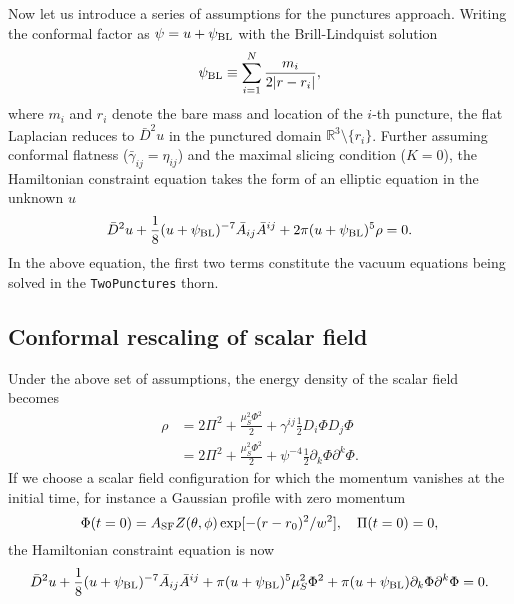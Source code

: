 Now let us introduce a series of assumptions for the punctures approach.
Writing the conformal factor as
$ \psi = u + \psi_{\rm BL} $
with the Brill-Lindquist solution
\begin{equation}
    \psi_{\rm BL} \equiv \sum_{i=1}^N \frac{m_i}{2|r - r_i|},
\end{equation}
where $m_i$ and $r_i$ denote the bare mass and location of the $i$-th puncture,
the flat Laplacian reduces to $\bar{D}^2 u$ in the punctured domain $\mathbb{R}^3\setminus\{r_i\}$.
Further assuming conformal flatness ($\bar{\gamma}_{ij} = \eta_{ij}$) and the maximal slicing condition ($K=0$), the Hamiltonian constraint equation takes the form of an elliptic equation in the unknown $u$
\begin{equation}
    \bar{D}^2 u + \frac{1}{8} (u+\psi_{\rm BL} )^{-7} \bar{A}_{ij} \bar{A}^{ij}
    + 2\pi (u+\psi_{\rm BL})^5 \rho = 0.
\end{equation}
In the above equation, the first two terms constitute the vacuum equations being solved in the \texttt{TwoPunctures} thorn.

\subsection{Conformal rescaling of scalar field}
Under the above set of assumptions, the energy density of the scalar field becomes
\begin{align}
    \rho
    &= 2 \Pi^2 + \frac{\mu_S^2 \Phi^2}{2}
    + \gamma^{ij} \frac{1}{2} D_i\Phi D_j \Phi
    \nonumber
    \\
    &= 2 \Pi^2 + \frac{\mu_S^2 \Phi^2}{2}
    + \psi^{-4} \frac{1}{2} \partial_k\Phi \partial^k \Phi.
\end{align}
If we choose a scalar field configuration for which the momentum vanishes at the initial time, for instance a Gaussian profile with zero momentum
\begin{equation}
    \Phi(t=0) = A_{\rm SF} Z(\theta, \phi) \exp[-(r-r_0)^2/w^2],
    \quad
    \Pi(t=0) = 0,
\end{equation}
the Hamiltonian constraint equation is now
\begin{equation}
    \bar{D}^2 u + \frac{1}{8} (u+\psi_{\rm BL} )^{-7} \bar{A}_{ij} \bar{A}^{ij}
    + \pi (u+\psi_{\rm BL})^5 \mu_S^2 \Phi^2
    + \pi (u+\psi_{\rm BL}) \partial_k\Phi \partial^k\Phi
    = 0.
\end{equation}

